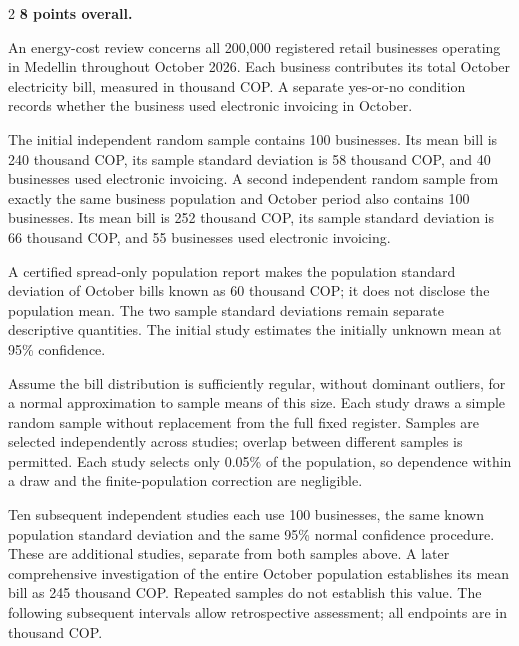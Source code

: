 \begin{multicols}{2}
\endgroup
\begingroup\small
{}
\textbf{8 points overall.}

An energy-cost review concerns all 200,000 registered retail businesses operating in Medellin throughout October 2026. Each business contributes its total October electricity bill, measured in thousand COP. A separate yes-or-no condition records whether the business used electronic invoicing in October.

The initial independent random sample contains 100 businesses. Its mean bill is 240 thousand COP, its sample standard deviation is 58 thousand COP, and 40 businesses used electronic invoicing. A second independent random sample from exactly the same business population and October period also contains 100 businesses. Its mean bill is 252 thousand COP, its sample standard deviation is 66 thousand COP, and 55 businesses used electronic invoicing.

A certified spread-only population report makes the population standard deviation of October bills known as 60 thousand COP; it does not disclose the population mean. The two sample standard deviations remain separate descriptive quantities. The initial study estimates the initially unknown mean at 95\% confidence.

Assume the bill distribution is sufficiently regular, without dominant outliers, for a normal approximation to sample means of this size. Each study draws a simple random sample without replacement from the full fixed register. Samples are selected independently across studies; overlap between different samples is permitted. Each study selects only 0.05\% of the population, so dependence within a draw and the finite-population correction are negligible.

Ten subsequent independent studies each use 100 businesses, the same known population standard deviation and the same 95\% normal confidence procedure. These are additional studies, separate from both samples above. A later comprehensive investigation of the entire October population establishes its mean bill as 245 thousand COP. Repeated samples do not establish this value. The following subsequent intervals allow retrospective assessment; all endpoints are in thousand COP.



\end{multicols}
